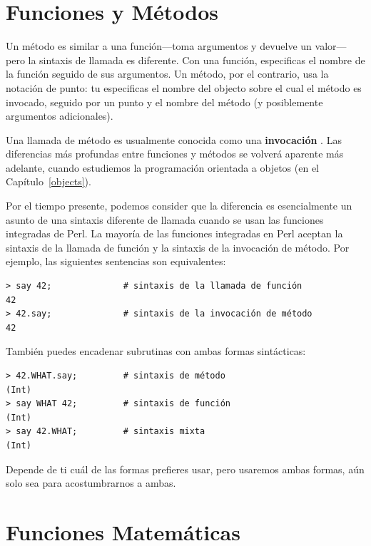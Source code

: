 \section{Funciones y Métodos}

Un método es similar a una función---toma argumentos y 
devuelve un valor---pero la sintaxis de llamada es
diferente. Con una función, especificas el nombre de la función
seguido de sus argumentos. Un método, por el contrario, usa 
la notación de punto: tu especificas el nombre del objecto
sobre el cual el método es invocado, seguido por un punto y
el nombre del método (y posiblemente argumentos adicionales).

% 
Una llamada de método es usualmente conocida como una 
{\bf invocación} . Las diferencias más
profundas entre funciones y métodos se volverá aparente 
más adelante, cuando estudiemos la programación orientada
a objetos (en el Capítulo~\ref{objects}).

Por el tiempo presente, podemos consider que la diferencia
es esencialmente un asunto de una sintaxis diferente de 
llamada cuando se usan las funciones integradas de Perl. La mayoría
de las funciones integradas en Perl aceptan la sintaxis de la llamada
de función y la sintaxis de la invocación de método. Por ejemplo,
las siguientes sentencias son equivalentes:

\begin{verbatim}
> say 42;              # sintaxis de la llamada de función
42
> 42.say;              # sintaxis de la invocación de método
42
\end{verbatim}
%

También puedes encadenar subrutinas con ambas formas
sintácticas:

\begin{verbatim}
> 42.WHAT.say;         # sintaxis de método
(Int)
> say WHAT 42;         # sintaxis de función
(Int)
> say 42.WHAT;         # sintaxis mixta
(Int)
\end{verbatim}
%

Depende de ti cuál de las formas prefieres usar, pero
usaremos ambas formas, aún solo sea para acostumbrarnos
a ambas.

\section{Funciones Matemáticas}


